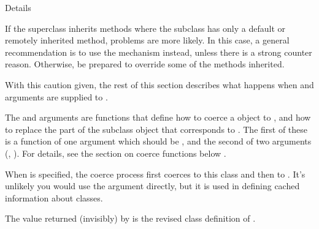 \begin{Section}{Details}
\begin{enumerate}
If the superclass inherits methods where the subclass has only a
default or remotely inherited method, problems are more likely.
In this case, a general
recommendation is to use the  mechanism
instead, unless there is a strong counter reason. Otherwise, be prepared to
override some of  the methods inherited.

\end{enumerate}


With this caution given, the rest of this section describes what
happens when  and  arguments are supplied
to .

The  and  arguments are functions that
define how to coerce a  object to , and
how to replace the part of the subclass object that corresponds to
.  The first of these is a function of one argument
which should be , and the second of two arguments
(, ).  For details, see the section on coerce
functions below .

When  is specified, the coerce process first coerces to
this class and then to .  It's unlikely you
would use the  argument directly, but it is used in defining
cached information about classes.

The value returned (invisibly) by
 is the revised class definition of .
\end{Section}
%
